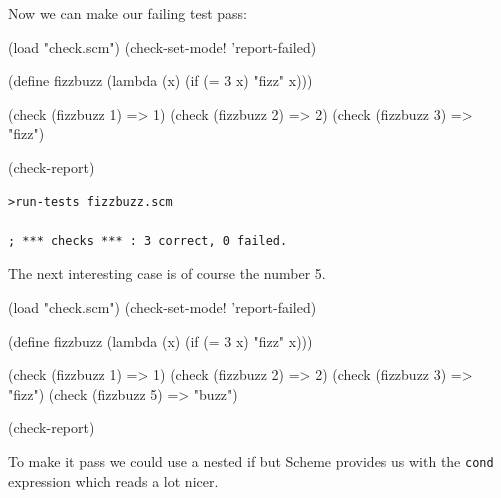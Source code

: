 \documentclass[12pt,a4paper,english,twoside]{article}
\begin{document}
Now we can make our failing test pass:
\begin{schemecode}
(load "check.scm")
(check-set-mode! 'report-failed)

(define fizzbuzz (lambda (x) (if (= 3 x) "fizz" x)))

(check (fizzbuzz 1) => 1)
(check (fizzbuzz 2) => 2)
(check (fizzbuzz 3) => "fizz")

(check-report)
\end{schemecode}
\begin{lstlisting}
>run-tests fizzbuzz.scm

; *** checks *** : 3 correct, 0 failed.
\end{lstlisting}
The next interesting case is of course the number 5.  \begin{schemecode}
(load "check.scm")
(check-set-mode! 'report-failed)

(define fizzbuzz (lambda (x) (if (= 3 x) "fizz" x)))

(check (fizzbuzz 1) => 1)
(check (fizzbuzz 2) => 2)
(check (fizzbuzz 3) => "fizz")
(check (fizzbuzz 5) => "buzz")

(check-report)
\end{schemecode}
To make it pass we could use a nested if but Scheme provides us with the 
\texttt{cond} expression which reads a lot nicer.
\end{document}

